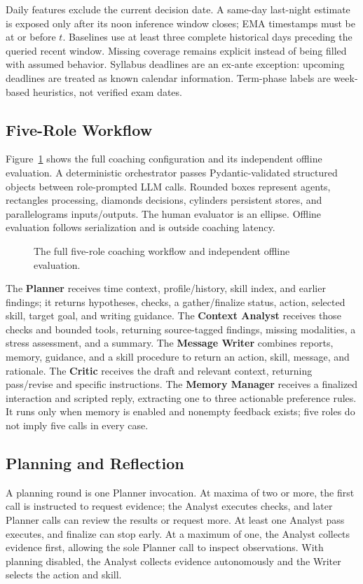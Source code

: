 \documentclass{article}
\begin{document}
Daily features exclude the current decision date. A same-day last-night estimate is exposed only after its noon inference window closes; EMA timestamps must be at or before $t$. Baselines use at least three complete historical days preceding the queried recent window. Missing coverage remains explicit instead of being filled with assumed behavior. Syllabus deadlines are an ex-ante exception: upcoming deadlines are treated as known calendar information. Term-phase labels are week-based heuristics, not verified exam dates.

\subsection{Five-Role Workflow}
Figure~\ref{fig:workflow} shows the full coaching configuration and its independent offline evaluation. A deterministic orchestrator passes Pydantic-validated structured objects between role-prompted LLM calls. Rounded boxes represent agents, rectangles processing, diamonds decisions, cylinders persistent stores, and parallelograms inputs/outputs. The human evaluator is an ellipse. Offline evaluation follows serialization and is outside coaching latency.

\begin{figure}[p]
\centering\resizebox{.99\textwidth}{!}{}
\caption{The full five-role coaching workflow and independent offline evaluation.}
\label{fig:workflow}
\end{figure}

The \textbf{Planner} receives time context, profile/history, skill index, and earlier findings; it returns hypotheses, checks, a gather/finalize status, action, selected skill, target goal, and writing guidance. The \textbf{Context Analyst} receives those checks and bounded tools, returning source-tagged findings, missing modalities, a stress assessment, and a summary. The \textbf{Message Writer} combines reports, memory, guidance, and a skill procedure to return an action, skill, message, and rationale. The \textbf{Critic} receives the draft and relevant context, returning pass/revise and specific instructions. The \textbf{Memory Manager} receives a finalized interaction and scripted reply, extracting one to three actionable preference rules. It runs only when memory is enabled and nonempty feedback exists; five roles do not imply five calls in every case.

\subsection{Planning and Reflection}
A planning round is one Planner invocation. At maxima of two or more, the first call is instructed to request evidence; the Analyst executes checks, and later Planner calls can review the results or request more. At least one Analyst pass executes, and finalize can stop early. At a maximum of one, the Analyst collects evidence first, allowing the sole Planner call to inspect observations. With planning disabled, the Analyst collects evidence autonomously and the Writer selects the action and skill.
\end{document}

